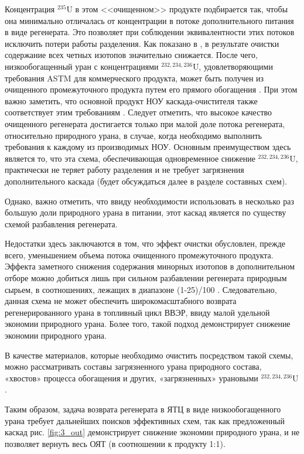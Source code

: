 Концентрация $^{235}$U в этом <<очищенном>> продукте подбирается так, чтобы она минимально отличалась от концентрации в потоке дополнительного питания в виде регенерата.
Это позволяет при соблюдении эквивалентности этих потоков исключить потери работы разделения.
Как показано в \cite{palkinSeparationUraniumIsotopes2010}, в результате очистки содержание всех четных изотопов значительно снижается. После чего, низкообогащенный уран с концентрациями $^{232,234,236}$U, удовлетворяющими требования ASTM для коммерческого продукта, может быть получен из очищенного промежуточного продукта путем его прямого обогащения \cite{shopenSposobPolucheniyaRazbavitelya2008}.
При этом важно заметить, что основной продукт НОУ каскада-очистителя также соответствует этим требованиям \cite{palkinSeparationUraniumIsotopes2010}. Следует отметить, что высокое качество очищенного регенерата достигается только при малой доле потока регенерата, относительно природного урана, в случае, когда необходимо выполнить требования к каждому из производимых НОУ.
Основным преимуществом здесь является то, что эта схема, обеспечивающая одновременное снижение $^{232,234,236}$U, практически не теряет работу разделения и не требует загрязнения дополнительного каскада (будет обсуждаться далее в разделе составных схем).

Однако, важно отметить, что ввиду необходимости использовать в несколько раз большую доли природного урана в питании, этот каскад является по существу схемой разбавления регенерата.

Недостатки здесь заключаются в том, что эффект очистки обусловлен, прежде всего, уменьшением объема потока очищенного промежуточного продукта. Эффекта заметного снижения содержания минорных изотопов в дополнительном отборе можно добиться лишь при сильном разбавлении регенерата природным сырьем, в соотношениях, лежащих в диапазоне (1-25)/100 \cite{palkinSeparationUraniumIsotopes2010, smirnovKaskadnyeShemyZadachah2012}.
Следовательно, данная схема не может обеспечить широкомасштабного возврата регенерированного урана в топливный цикл ВВЭР, ввиду малой удельной экономии природного урана.
Более того, такой подход демонстрирует снижение экономии природного урана.

В качестве материалов, которые необходимо очистить посредством такой схемы, можно рассматривать составы загрязненного урана природного состава, «хвостов» процесса обогащения и других, «загрязненных» урановыми $^{232,234,236}$U \cite{palkinSeparationUraniumIsotopes2010}. 

Таким образом, задача возврата регенерата в ЯТЦ в виде низкообогащенного урана требует дальнейших поисков эффективных схем, так как предложенный каскад рис. \ref{fig:3_out} демонстрирует снижение экономии природного урана, и не позволяет вернуть весь ОЯТ (в соотношении к продукту 1:1).

